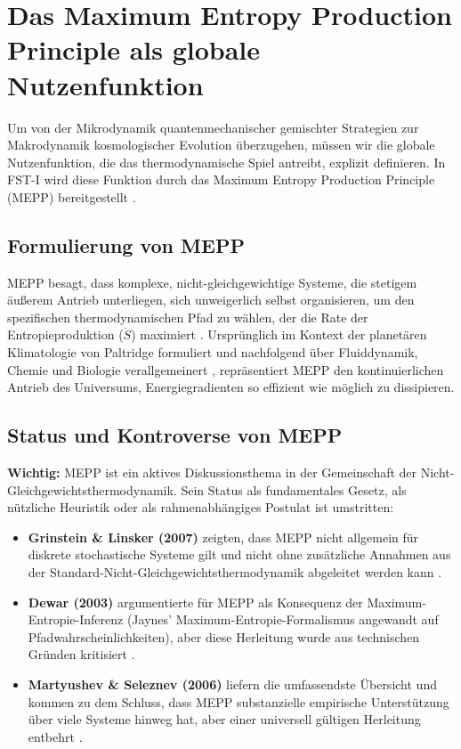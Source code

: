 \documentclass[12pt,a4paper]{article}
\theoremstyle{remark}
\begin{document}
\section{Das Maximum Entropy Production Principle als globale Nutzenfunktion}
\label{sec:mepp}

Um von der Mikrodynamik quantenmechanischer gemischter Strategien zur Makrodynamik kosmologischer Evolution \"uberzugehen, m\"ussen wir die globale Nutzenfunktion, die das thermodynamische Spiel antreibt, explizit definieren. In FST-I wird diese Funktion durch das Maximum Entropy Production Principle (MEPP) bereitgestellt \citep{MEPP2010}.

\subsection{Formulierung von MEPP}

MEPP besagt, dass komplexe, nicht-gleichgewichtige Systeme, die stetigem \"au\ss{}erem Antrieb unterliegen, sich unweigerlich selbst organisieren, um den spezifischen thermodynamischen Pfad zu w\"ahlen, der die Rate der Entropieproduktion ($\dot{S}$) maximiert \citep{MEPPFoundations}. Urspr\"unglich im Kontext der planet\"aren Klimatologie von Paltridge formuliert und nachfolgend \"uber Fluiddynamik, Chemie und Biologie verallgemeinert \citep{MEPP2010}, repr\"asentiert MEPP den kontinuierlichen Antrieb des Universums, Energiegradienten so effizient wie m\"oglich zu dissipieren.

\subsection{Status und Kontroverse von MEPP}

\textbf{Wichtig:} MEPP ist ein aktives Diskussionsthema in der Gemeinschaft der Nicht-Gleichgewichtsthermodynamik. Sein Status als fundamentales Gesetz, als n\"utzliche Heuristik oder als rahmenabh\"angiges Postulat ist umstritten:

\begin{itemize}
    \item \textbf{Grinstein \& Linsker (2007)} zeigten, dass MEPP nicht allgemein f\"ur diskrete stochastische Systeme gilt und nicht ohne zus\"atzliche Annahmen aus der Standard-Nicht-Gleichgewichtsthermodynamik abgeleitet werden kann \citep{GrinsteinLinsker2007}.
    \item \textbf{Dewar (2003)} argumentierte f\"ur MEPP als Konsequenz der Maximum-Entropie-Inferenz (Jaynes' Maximum-Entropie-Formalismus angewandt auf Pfadwahrscheinlichkeiten), aber diese Herleitung wurde aus technischen Gr\"unden kritisiert \citep{Dewar2003}.
    \item \textbf{Martyushev \& Seleznev (2006)} liefern die umfassendste \"Ubersicht und kommen zu dem Schluss, dass MEPP substanzielle empirische Unterst\"utzung \"uber viele Systeme hinweg hat, aber einer universell g\"ultigen Herleitung entbehrt \citep{MEPP2023}.
\end{itemize}
\end{document}
